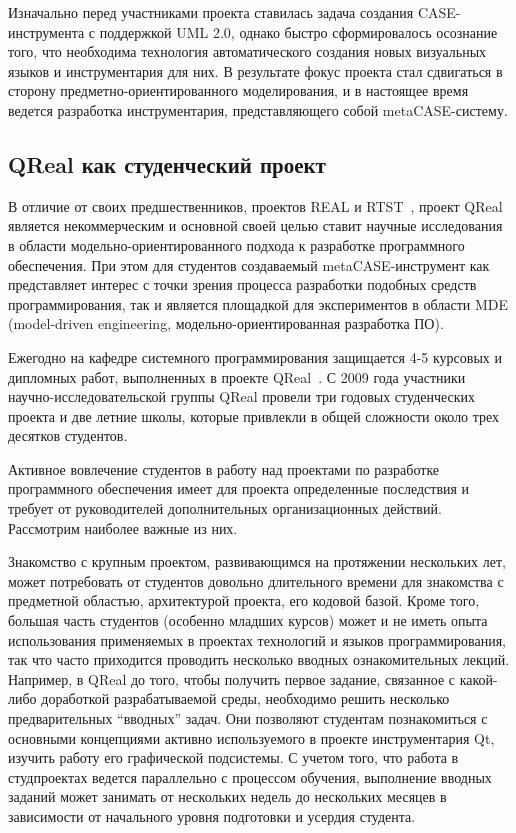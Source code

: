 \documentclass[a4paper]{article}
\begin{document}
Изначально перед участниками проекта ставилась задача создания CASE-инструмента с поддержкой UML 2.0, однако быстро сформировалось осознание того, что необходима технология автоматического создания новых визуальных языков и инструментария для них. В результате фокус проекта стал сдвигаться в сторону предметно-ориентированного моделирования, и в настоящее время ведется разработка инструментария, представляющего собой metaCASE-систему. 

\subsection{QReal как студенческий проект}

В отличие от своих предшественников, проектов REAL и RTST~\cite{rtst}, проект QReal является некоммерческим и основной своей целью ставит научные исследования в области модельно-ориентированного подхода к разработке программного обеспечения. При этом для студентов создаваемый metaCASE-инструмент как представляет интерес с точки зрения процесса разработки подобных средств программирования, так и является площадкой для экспериментов в области MDE (model-driven engineering, модельно-ориентированная разработка ПО). 

Ежегодно на кафедре системного программирования защищается 4-5 курсовых и дипломных работ, выполненных в проекте QReal~\cite{termPapers}. С 2009 года участники научно-исследовательской группы QReal провели три годовых студенческих проекта и две летние школы, которые привлекли в общей сложности около трех десятков студентов.

Активное вовлечение студентов в работу над проектами по разработке программного обеспечения имеет для проекта определенные последствия и требует от руководителей дополнительных организационных действий. Рассмотрим наиболее важные из них.

Знакомство с крупным проектом, развивающимся на протяжении нескольких лет, может потребовать от студентов довольно длительного времени для знакомства с предметной областью, архитектурой проекта, его кодовой базой. Кроме того, большая часть студентов (особенно младших курсов) может и не иметь опыта использования применяемых в проектах технологий и языков программирования, так что часто приходится проводить несколько вводных ознакомительных лекций. Например, в QReal до того, чтобы получить первое задание, связанное с какой-либо доработкой разрабатываемой среды, необходимо решить несколько предварительных ``вводных'' задач. Они позволяют студентам познакомиться с основными концепциями активно используемого в проекте инструментария Qt, изучить работу его графической подсистемы. С учетом того, что работа в студпроектах ведется параллельно с процессом обучения, выполнение вводных заданий может занимать от нескольких недель до нескольких месяцев в зависимости от начального уровня подготовки и усердия студента.
\end{document}
